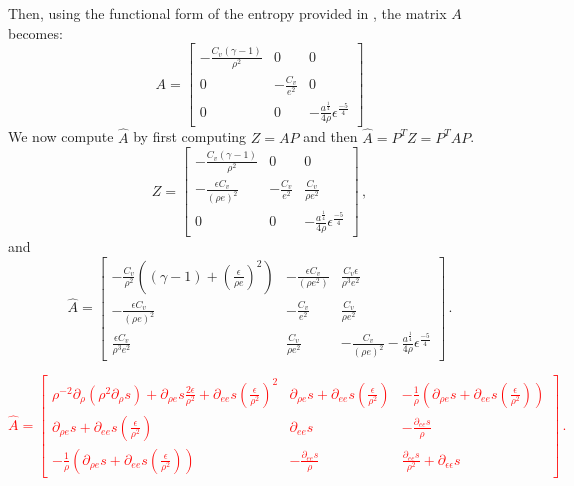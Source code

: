 \documentclass[times,doublespace]{fldauth}%
\newcommand{\sdd}{\ensuremath{\rho^{-2}\partial_{\rho}(\rho^2 \partial_{\rho} s)}}
\newcommand{\sde}{\ensuremath{\partial_{\rho e} s}}
\newcommand{\see}{\ensuremath{\partial_{e e} s}}
\newcommand{\srr}{\ensuremath{\partial_{\epsilon \epsilon} s}}
\begin{document}
%
Then, using the functional form of the entropy provided in , the matrix $A$ becomes:
%
\begin{equation}
A = 
\begin{bmatrix}
-\frac{C_v (\gamma-1)}{\rho^2} & 0 & 0 \\
0 & -\frac{C_v}{e^2} & 0 \\
0 & 0 & -\frac{a^\frac{1}{4}}{4\rho}\epsilon^\frac{-5}{4}
\end{bmatrix}
\end{equation}
%
We now compute $\hat{A}$ by first computing $Z=AP$ and then $\hat{A} = P^T Z = P^T A P$.
%
\begin{equation}
Z = 
\begin{bmatrix}
-\frac{C_v (\gamma-1)}{\rho^2} & 0 & 0 \\
-\frac{\epsilon C_v}{(\rho e)^2} & -\frac{C_v}{e^2} & \frac{C_v}{\rho e^2} \\
0 & 0 & -\frac{a^\frac{1}{4}}{4\rho}\epsilon^\frac{-5}{4}
\end{bmatrix} \, ,
\end{equation}
%
and 
%
\begin{equation}
\hat{A} = 
\begin{bmatrix}
-\frac{C_v}{\rho^2} \left((\gamma-1)+\left(\frac{\epsilon}{\rho e}\right)^2\right) & -\frac{\epsilon C_v}{(\rho e^2)} & \frac{C_v \epsilon}{\rho^3 e^2} \\
-\frac{\epsilon C_v}{(\rho e)^2} & -\frac{C_v}{e^2} & \frac{C_v}{\rho e^2} \\
\frac{\epsilon C_v}{\rho^3 e^2} & \frac{C_v}{\rho e^2} & -\frac{C_v}{(\rho e)^2}-\frac{a^\frac{1}{4}}{4\rho}\epsilon^\frac{-5}{4}
\end{bmatrix} \, .
\end{equation}

\textcolor{red}{
\begin{equation}\label{eq:gen-matrix}
\hat{A} = 
\begin{bmatrix}
\sdd + \sde\frac{2 \epsilon}{\rho^2} + \see \left(\frac{\epsilon}{\rho^2}\right)^2 &
\sde  + \see \left(\frac{\epsilon}{\rho^2}\right) &
-\frac{1}{\rho} \left( \sde  + \see \left(\frac{\epsilon}{\rho^2}\right) \right) \\
\sde  + \see \left(\frac{\epsilon}{\rho^2}\right) &
\see &
-\frac{\see}{\rho} \\
-\frac{1}{\rho} \left( \sde  + \see \left(\frac{\epsilon}{\rho^2}\right) \right) &
-\frac{\see}{\rho} &
\frac{\see}{\rho^2} + \srr
\end{bmatrix} \, .
\end{equation}
}
\end{document}
